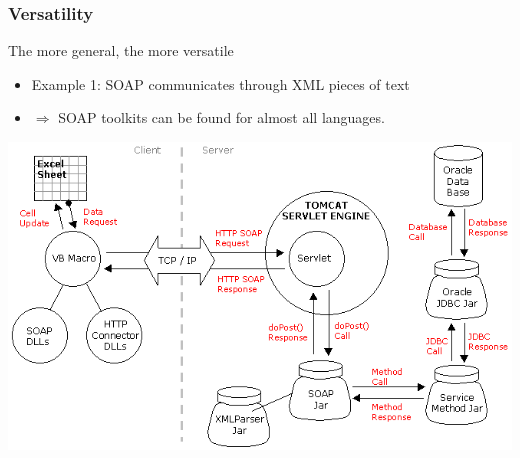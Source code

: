 \documentclass[bigger,hyperref={colorlinks=true, urlcolor=red, plainpages=false, pdfpagelabels, bookmarksnumbered}]{beamer}
\begin{document}
\begin{frame}
\frametitle{Versatility}
\label{sec-1-8}

   The more general, the more versatile 
\begin{itemize}
\item Example 1: SOAP communicates through XML pieces of text
\item $\Rightarrow$ SOAP toolkits can be found for almost all languages.
\end{itemize}
\includegraphics[width=.9\linewidth]{../soap-img/soapuser-archi1.png}
\end{frame}
\end{document}
